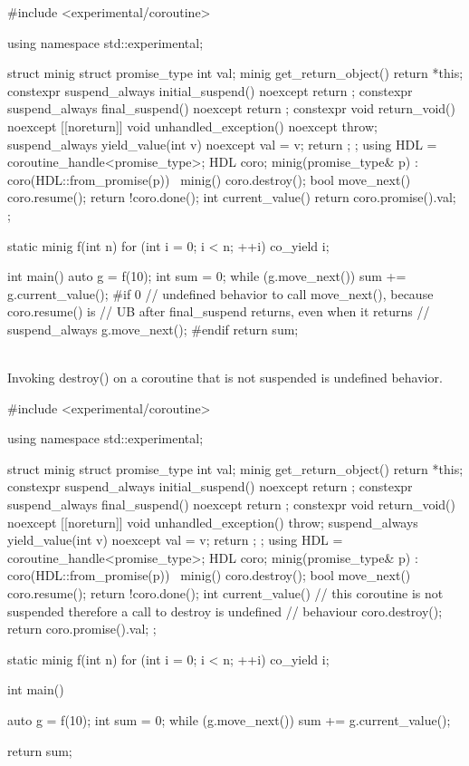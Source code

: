 \pnum
\begin{example}
\begin{codeblock}
#include <experimental/coroutine>

using namespace std::experimental;

struct minig {
  struct promise_type {
    int val;
    minig get_return_object() { return {*this}; }
    constexpr suspend_always initial_suspend() noexcept { return {}; }
    constexpr suspend_always final_suspend() noexcept { return {}; }
    constexpr void return_void() noexcept {}
    [[noreturn]] void unhandled_exception() noexcept { throw; }
    suspend_always yield_value(int v) noexcept {
      val = v;
      return {};
    }
  };
  using HDL = coroutine_handle<promise_type>;
  HDL coro;
  minig(promise_type& p) : coro(HDL::from_promise(p)) {}
  ~minig() { coro.destroy(); }
  bool move_next() {
    coro.resume();
    return !coro.done();
  }
  int current_value() { return coro.promise().val; }
};

static minig f(int n) {
  for (int i = 0; i < n; ++i)
    co_yield i;
}

int main() {
  auto g = f(10);
  int sum = 0;
  while (g.move_next())
    sum += g.current_value();
#if 0
  // undefined behavior to call move_next(), because coro.resume() is
  // UB after final_suspend returns, even when it returns
  // suspend_always
  g.move_next();
#endif
  return sum;
}
\end{codeblock}
\end{example}


\pnum
{} \\
Invoking destroy() on a coroutine that is not suspended is undefined behavior.

\pnum
\begin{example}
\begin{codeblock}
#include <experimental/coroutine>

using namespace std::experimental;

struct minig {
  struct promise_type {
    int val;
    minig get_return_object() { return {*this}; }
    constexpr suspend_always initial_suspend() noexcept { return {}; }
    constexpr suspend_always final_suspend() noexcept { return {}; }
    constexpr void return_void() noexcept {}
    [[noreturn]] void unhandled_exception() { throw; }
    suspend_always yield_value(int v) noexcept {
      val = v;
      return {};
    }
  };
  using HDL = coroutine_handle<promise_type>;
  HDL coro;
  minig(promise_type& p) : coro(HDL::from_promise(p)) {}
  ~minig() { coro.destroy(); }
  bool move_next() {
    coro.resume();
    return !coro.done();
  }
  int current_value() {
    // this coroutine is not suspended therefore a call to destroy is undefined
    // behaviour
    coro.destroy();
    return coro.promise().val;
  }
};

static minig f(int n) {
  for (int i = 0; i < n; ++i)
    co_yield i;
}

int main() {
  auto g = f(10);
  int sum = 0;
  while (g.move_next())
    sum += g.current_value();

  return sum;
}
\end{codeblock}
\end{example}

